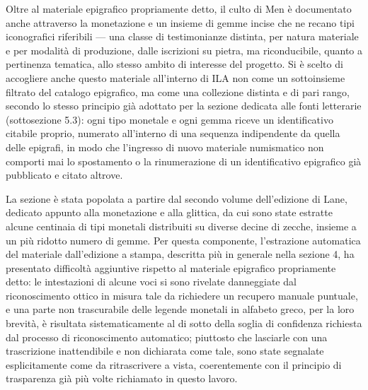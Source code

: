 \documentclass[11pt,a4paper]{article}
\begin{document}
Oltre al materiale epigrafico propriamente detto, il culto di Men è
documentato anche attraverso la monetazione e un insieme di gemme
incise che ne recano tipi iconografici riferibili --- una classe di
testimonianze distinta, per natura materiale e per modalità di
produzione, dalle iscrizioni su pietra, ma riconducibile, quanto a
pertinenza tematica, allo stesso ambito di interesse del progetto. Si
è scelto di accogliere anche questo materiale all'interno di ILA non
come un sottoinsieme filtrato del catalogo epigrafico, ma come una
collezione distinta e di pari rango, secondo lo stesso principio già
adottato per la sezione dedicata alle fonti letterarie (sottosezione
5.3): ogni tipo monetale e ogni gemma riceve un identificativo
citabile proprio, numerato all'interno di una sequenza indipendente da
quella delle epigrafi, in modo che l'ingresso di nuovo materiale
numismatico non comporti mai lo spostamento o la rinumerazione di un
identificativo epigrafico già pubblicato e citato altrove.

La sezione è stata popolata a partire dal secondo volume dell'edizione
di Lane, dedicato appunto alla monetazione e alla glittica, da cui sono
state estratte alcune centinaia di tipi monetali distribuiti su diverse
decine di zecche, insieme a un più ridotto numero di gemme. Per questa
componente, l'estrazione automatica del materiale dall'edizione a
stampa, descritta più in generale nella sezione 4, ha presentato
difficoltà aggiuntive rispetto al materiale epigrafico propriamente
detto: le intestazioni di alcune voci si sono rivelate danneggiate dal
riconoscimento ottico in misura tale da richiedere un recupero manuale
puntuale, e una parte non trascurabile delle legende monetali in
alfabeto greco, per la loro brevità, è risultata sistematicamente al
di sotto della soglia di confidenza richiesta dal processo di
riconoscimento automatico; piuttosto che lasciarle con una trascrizione
inattendibile e non dichiarata come tale, sono state segnalate
esplicitamente come da ritrascrivere a vista, coerentemente con il
principio di trasparenza già più volte richiamato in questo lavoro.
\end{document}
